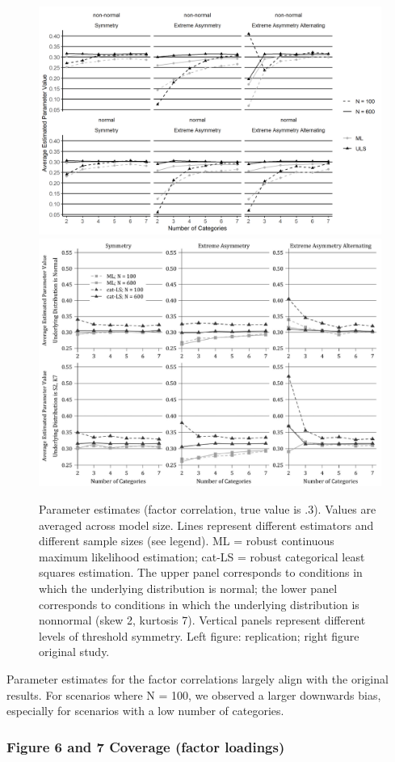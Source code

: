 \documentclass[10,a4paperpaper,]{article}
\begin{document}
\begin{figure}
\includegraphics[width=0.49\linewidth]{./figures/fig_5} \includegraphics[width=0.49\linewidth]{./figures/fig5_original} \caption{Parameter estimates (factor correlation, true value is .3). Values are averaged across model size. Lines represent different estimators and different sample sizes (see legend). ML = robust continuous maximum likelihood estimation; cat-LS = robust categorical least squares estimation. The upper panel corresponds to conditions in which the underlying distribution is normal; the lower panel corresponds to conditions in which the underlying distribution is nonnormal (skew 2, kurtosis 7). Vertical panels represent different levels of threshold symmetry. Left figure: replication; right figure original study.}\label{fig:fig5}
\end{figure}

Parameter estimates for the factor correlations largely align with the
original results. For scenarios where N = 100, we observed a larger
downwards bias, especially for scenarios with a low number of
categories.

\subsubsection{Figure 6 and 7 Coverage (factor loadings)}
\end{document}
